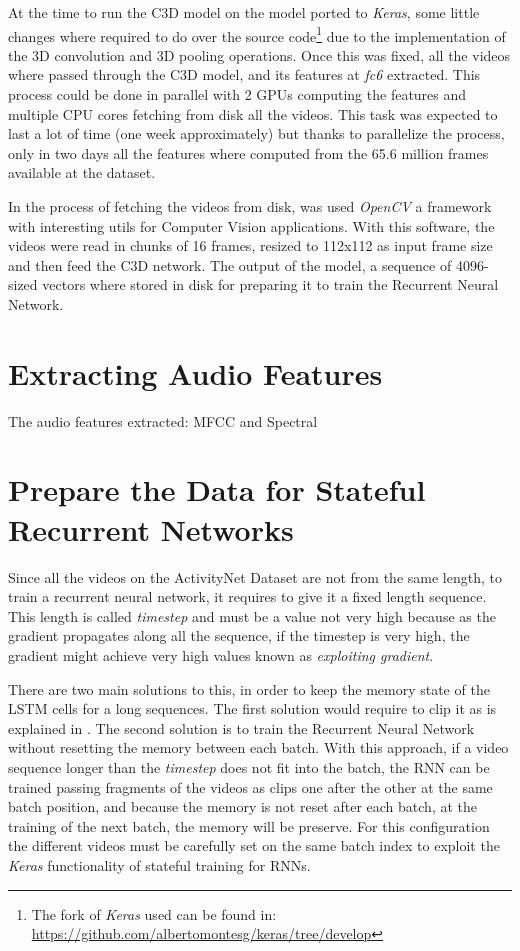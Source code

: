 At the time to run the C3D model on the model ported to \textit{Keras}, some little changes where required to do over the source code\footnote{The fork of \textit{Keras} used can be found in: \url{https://github.com/albertomontesg/keras/tree/develop}} due to the implementation of the 3D convolution and 3D pooling operations. Once this was fixed, all the videos where passed through the C3D model, and its features at \textit{fc6} extracted. This process could be done in parallel with 2 GPUs computing the features and multiple CPU cores fetching from disk all the videos. This task was expected to last a lot of time (one week approximately) but thanks to parallelize the process, only in two days all the features where computed from the 65.6 million frames available at the dataset.

In the process of fetching the videos from disk, was used \textit{OpenCV}\cite{opencv_library} a framework with interesting utils for Computer Vision applications. With this software, the videos were read in chunks of 16 frames, resized to 112x112 as input frame size and then feed the C3D network. The output of the model, a sequence of 4096-sized vectors where stored in disk for preparing it to train the Recurrent Neural Network.

\section{Extracting Audio Features}

The audio features extracted: MFCC and Spectral


\section{Prepare the Data for Stateful Recurrent Networks}

Since all the videos on the ActivityNet Dataset are not from the same length, to train a recurrent neural network, it requires to give it a fixed length sequence. This length is called \textit{timestep} and must be a value not very high because as the gradient propagates along all the sequence, if the timestep is very high, the gradient might achieve very high values known as \textit{exploiting gradient}.

There are two main solutions to this, in order to keep the memory state of the LSTM cells for a long sequences. The first solution would require to clip it as is explained in \cite{pascanu2012difficulty}. The second solution is to train the Recurrent Neural Network without resetting the memory between each batch. With this approach, if a video sequence longer than the \textit{timestep} does not fit into the batch, the RNN can be trained passing fragments of the videos as clips one after the other at the same batch position, and because the memory is not reset after each batch, at the training of the next batch, the memory will be preserve. For this configuration the different videos must be carefully set on the same batch index to exploit the \textit{Keras} functionality of stateful training for RNNs.

